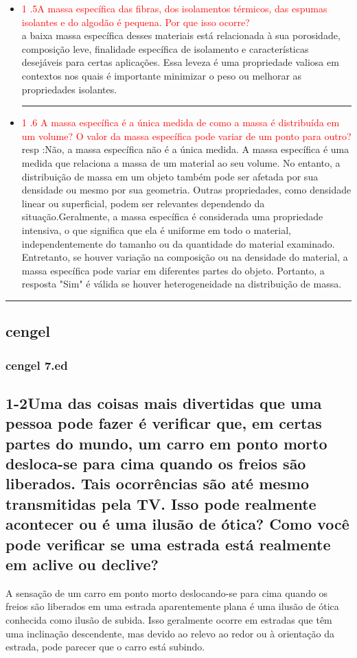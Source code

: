 \documentclass{article}
\begin{document}
\begin{itemize}
    \noindent\rule{\textwidth}{0.4pt}
    \item \textcolor{red}{1 .5A massa específica das fibras, dos isolamentos térmicos, das espumas isolantes e do algodão é pequena. Por que isso ocorre?}\\
    a baixa massa específica desses materiais está relacionada à sua porosidade, composição leve, finalidade específica de isolamento e características desejáveis para certas aplicações. Essa leveza é uma propriedade valiosa em contextos nos quais é importante minimizar o peso ou melhorar as propriedades isolantes.\\
    \noindent\rule{\textwidth}{0.4pt}
    \item \textcolor{red}{1 .6 A massa específica é a única medida de como a massa é distribuída em um volume? O valor da massa específica pode variar de um ponto para outro?}\\
    resp :Não, a massa específica não é a única medida. A massa específica é uma medida que relaciona a massa de um material ao seu volume. No entanto, a distribuição de massa em um objeto também pode ser afetada por sua densidade ou mesmo por sua geometria. Outras propriedades, como densidade linear ou superficial, podem ser relevantes dependendo da situação.Geralmente, a massa específica é considerada uma propriedade intensiva, o que significa que ela é uniforme em todo o material, independentemente do tamanho ou da quantidade do material examinado. Entretanto, se houver variação na composição ou na densidade do material, a massa específica pode variar em diferentes partes do objeto. Portanto, a resposta "Sim" é válida se houver heterogeneidade na distribuição de massa.
    
\end{itemize}
\noindent\rule{\textwidth}{0.4pt}
\subsection{cengel}
\subsubsection{cengel 7.ed}
\subsection*{1-2Uma das coisas mais divertidas que uma pessoa pode fazer é verificar que, em certas partes do mundo, um carro em ponto morto desloca-se para cima quando os freios são liberados. Tais ocorrências são até mesmo transmitidas pela TV. Isso pode realmente acontecer ou é uma ilusão de ótica? Como você pode verificar se uma estrada está realmente em aclive ou declive?}
A sensação de um carro em ponto morto deslocando-se para cima quando os freios são liberados em uma estrada aparentemente plana é uma ilusão de ótica conhecida como ilusão de subida. Isso geralmente ocorre em estradas que têm uma inclinação descendente, mas devido ao relevo ao redor ou à orientação da estrada, pode parecer que o carro está subindo.
\end{document}
